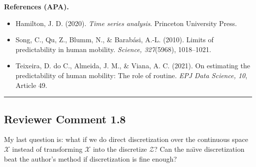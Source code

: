 \documentclass{NSF}
\begin{document}
\vskip 0.05in
\noindent\textbf{References (APA).}
\begin{itemize}
    \item Hamilton, J. D. (2020). \textit{Time series analysis}. Princeton University Press.
    \item Song, C., Qu, Z., Blumm, N., \& Barab\'asi, A.-L. (2010). Limits of predictability in human mobility. \textit{Science, 327}(5968), 1018--1021.
    \item Teixeira, D. do C., Almeida, J. M., \& Viana, A. C. (2021). On estimating the predictability of human mobility: The role of routine. \textit{EPJ Data Science, 10}, Article 49.
\end{itemize}

\noindent\rule{16.5cm}{1.0pt}

\subsection{Reviewer Comment 1.8}
\begin{mdframed}
My last question is: what if we do direct discretization over the continuous space $\mathcal{X}$ instead of transforming $\mathcal{X}$ into the discretize $\mathcal{Z}$? Can the na\"{\i}ve discretization beat the author's method if discretization is fine enough?
\end{mdframed}
\end{document}
